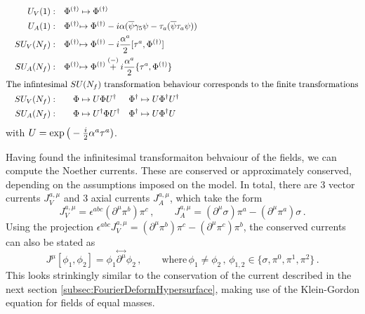 \begin{subequations}
\begin{align}
         &  & U_V(1): &  & \Phi^{(\dagger)} & \mapsto \Phi^{(\dagger)}                                                              \\
         &  & U_A(1): &  & \Phi^{(\dagger)} & \mathrlap{\mapsto \Phi^{(\dagger)}-\imagu\alpha(\overline{\psi}\gamma_5\psi-\tau_a(\overline{\psi}\tau_a\psi))} &        &                                  \\
         &  & SU_V(N_f): &  & \Phi^{(\dagger)} & \mathrlap{\mapsto \Phi^{(\dagger)}-\imagu\frac{\alpha^a}{2}[\tau^a,\Phi^{(\dagger)}]}  &        &                                                            \\
         &  & SU_A(N_f): &  & \Phi^{(\dagger)} & \mathrlap{\mapsto \Phi^{(\dagger)}\overset{(-)}{+}\imagu\frac{\alpha^a}{2}\{\tau^a,\Phi^{(\dagger)}\}} &        &                                  \\
        \intertext{The infintesimal ${SU(N_f)}$ transformation behaviour corresponds to the finite transformations}
         &  & SU_V(N_f): &  & \Phi & \mapsto U\Phi U^\dagger                                                          &        \Phi^{\dagger} & \mapsto U\Phi^{\dagger}U^\dagger                                  \\
         &  & SU_A(N_f): &  & \Phi             & \mapsto U^\dagger\Phi U^\dagger&\Phi^\dagger&\mapsto U\Phi^\dagger U                 &                                              
    \end{align}
\end{subequations}
with $U=\exp\big(-\frac{{i}}{2}\alpha^a\tau^a)$.

Having found the infinitesimal transformaiton behvaiour of the fields, we can compute the Noether currents. These are conserved or approximately conserved, depending on the assumptions imposed on the model. In total, there are 3 vector currents $J_V^{a,\mu}$ and 3 axial currents $J_A^{a,\mu}$, which take the form
\begin{equation}
    J_V^{a,\mu}=\epsilon^{abc}(\partial^\mu\pi^b)\pi^c\,,\qquad J_A^{a,\mu}=(\partial^\mu\sigma)\pi^a-(\partial^\mu\pi^a)\sigma\,.
\end{equation}
Using the projection $\epsilon^{abc}J_V^{a,\mu}=(\partial^\mu\pi^b)\pi^c-(\partial^\mu\pi^c)\pi^b$, the conserved currents can also be stated as
\begin{equation}
    J^\mu[\phi_1,\phi_2]=\phi_1\overset{\leftrightarrow}{\partial^\mu}\phi_2\,,\qquad\text{where}\,\phi_{1}\neq\phi_2\,,\,\phi_{1,2}\in\{\sigma,\pi^0,\pi^1,\pi^2\}\,.
\end{equation}
This looks strinkingly similar to the conservation of the current described in the next section \eqref{subsec:FourierDeformHypersurface}, making use of the Klein-Gordon equation for fields of equal masses. 



